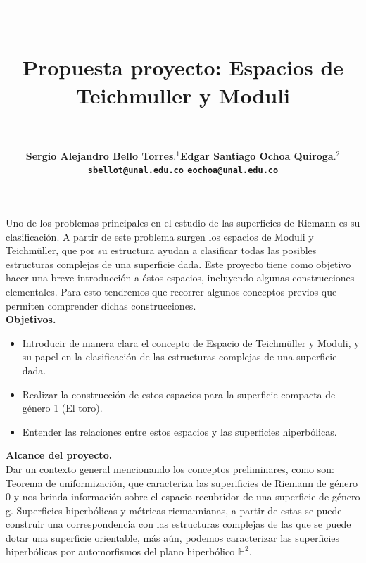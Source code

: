 \documentclass[12pt]{article}
\title{\vspace{-2cm}\par\noindent\rule{16cm}{1pt}\large
\\\bfseries Propuesta proyecto: Espacios de Teichmuller y Moduli
\vspace{-0.34cm}\par\noindent\hspace{0.15cm}\rule{16cm}{1pt}
\vspace{-0.6cm}
}
\author{\small \bfseries Sergio Alejandro Bello Torres$.^{1}$\quad \quad\small Edgar Santiago Ochoa Quiroga$.^{2}$\\ \small \quad \texttt{sbellot@unal.edu.co} \quad \quad \quad \quad \quad \quad \texttt{eochoa@unal.edu.co}\quad\quad \quad\\}
\begin{document}
\maketitle

Uno de los problemas principales en el estudio de las superficies de Riemann es su clasificación. A partir de este problema surgen los espacios de Moduli y Teichmüller, que por su estructura ayudan a clasificar todas las posibles estructuras complejas de una superficie dada. Este proyecto tiene como objetivo hacer una breve introducción a éstos espacios, incluyendo algunas construcciones elementales. Para esto tendremos que recorrer algunos conceptos previos que permiten comprender dichas construcciones.\\

\textbf{Objetivos.}
\begin{itemize}
    \item Introducir de manera clara el concepto de Espacio de Teichmüller y Moduli, y su papel en la clasificación de las estructuras complejas de una superficie dada.
    \item Realizar la construcción de estos espacios para la superficie compacta de género 1 (El toro).
    \item Entender las relaciones entre estos espacios y las superficies hiperbólicas.
\end{itemize}

\textbf{Alcance del proyecto.}\\
    
    Dar un contexto general mencionando los conceptos preliminares, como son: Teorema de uniformización, que caracteriza las superificies de Riemann de género 0 y nos brinda información sobre el espacio recubridor de una superficie de género g. Superficies hiperbólicas y métricas riemannianas, a partir de estas se puede construir una correspondencia con las estructuras complejas de las que se puede dotar una superficie orientable, más aún, podemos caracterizar las superficies hiperbólicas por automorfismos del plano hiperbólico $\mathbb{H}^2$.
\end{document}
